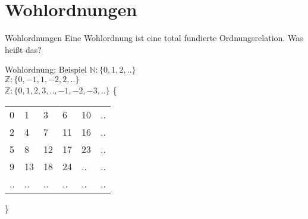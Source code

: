 \section{Wohlordnungen}


\begin{frame}[c]{Wohlordnungen}
    \Large
    Eine Wohlordnung ist eine total fundierte Ordnungsrelation.
    \newline
    \bigskip
    \pause
    Was heißt das?
\end{frame}


\begin{frame}[c]{Wohlordnung: Beispiel}
    \Large
    $\mathbb{N}: \{0, 1, 2, .. \}$ \\
    \pause
    $\mathbb{Z}: \{0, -1, 1, -2, 2,..\}$  \\
    \pause
    $\mathbb{Z}: \{0, 1, 2, 3,.., -1, -2, -3,.. \}$ \newline
    \newline
    \newline
    \pause
    \{
    \normalsize
    \begin{tabular}{|llllll}
        \hline
        0 & 1 & 3 & 6 & 10 & ..\\
        2 & 4 & 7 & 11 & 16 & .. \\
        5 & 8 & 12 & 17 & 23 & .. \\
        9 & 13 & 18 & 24 & .. & .. \\
        .. & .. & .. & .. & .. & ..
    \end{tabular}
    \Large
    \}
\end{frame}

